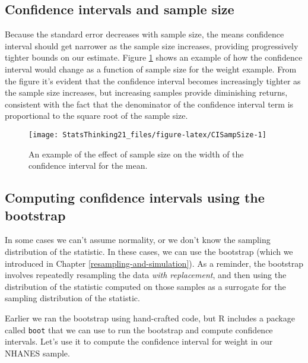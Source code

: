 \documentclass[]{book}
\theoremstyle{definition}
\theoremstyle{definition}
\theoremstyle{definition}
\theoremstyle{remark}
\begin{document}
\subsection{Confidence intervals and sample
size}\label{confidence-intervals-and-sample-size}

Because the standard error decreases with sample size, the means
confidence interval should get narrower as the sample size increases,
providing progressively tighter bounds on our estimate. Figure
\ref{fig:CISampSize} shows an example of how the confidence interval
would change as a function of sample size for the weight example. From
the figure it's evident that the confidence interval becomes
increasingly tighter as the sample size increases, but increasing
samples provide diminishing returns, consistent with the fact that the
denominator of the confidence interval term is proportional to the
square root of the sample size.

\begin{figure}
\texttt{[image: StatsThinking21\_files/figure-latex/CISampSize-1]} \caption{An example of the effect of sample size on the width of the confidence interval for the mean.}\label{fig:CISampSize}
\end{figure}

\subsection{Computing confidence intervals using the
bootstrap}\label{computing-confidence-intervals-using-the-bootstrap}

In some cases we can't assume normality, or we don't know the sampling
distribution of the statistic. In these cases, we can use the bootstrap
(which we introduced in Chapter \ref{resampling-and-simulation}). As a
reminder, the bootstrap involves repeatedly resampling the data
\emph{with replacement}, and then using the distribution of the
statistic computed on those samples as a surrogate for the sampling
distribution of the statistic.

Earlier we ran the bootstrap using hand-crafted code, but R includes a
package called \texttt{boot} that we can use to run the bootstrap and
compute confidence intervals. Let's use it to compute the confidence
interval for weight in our NHANES sample.
\end{document}
